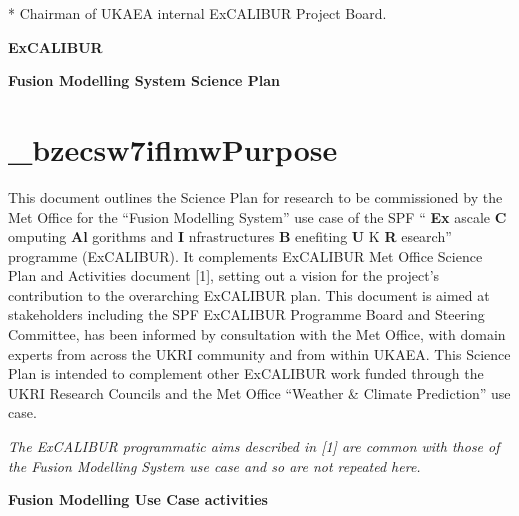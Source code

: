 \documentclass{article}
\begin{document}
\vspace{75pt}
\baselineskip=12pt
\leftskip=0pt
* Chairman of UKAEA internal ExCALIBUR Project Board.

\vspace{147pt}
\baselineskip=13pt
\parindent=-14pt
{\Huge{}{\color{color25} \textbf{ExCALIBUR}}}

\vspace{3pt}
\leftskip=-14pt
\parindent=0pt
{\Huge{}{\color{color25} \textbf{Fusion Modelling System Science Plan \label{}}}}

\vspace{12pt}
\section*{{\huge{}{\color{color25} \textbf{\_bzecsw7iflmwPurpose}}}}

\vspace{24pt}
{\color{color01} This document outlines the Science Plan for research to be commissioned 
by the Met Office for the ``Fusion Modelling System'' use case of the SPF ``}{\color{color25} \textbf{Ex}}{\color{color01} ascale 
}{\color{color25} \textbf{C}}{\color{color01} omputing }{\color{color25} \textbf{Al}}{\color{color01} gorithms 
and }{\color{color25} \textbf{I}}{\color{color01} nfrastructures }{\color{color25} \textbf{B}}{\color{color01} enefiting 
}{\color{color25} \textbf{U}}{\color{color01} K }{\color{color25} \textbf{R}}{\color{color01} esearch'' 
programme (ExCALIBUR). It complements ExCALIBUR Met Office Science Plan and Activities 
document [1], setting out a vision for the project's contribution to the overarching 
ExCALIBUR plan. This document is aimed at stakeholders including the SPF ExCALIBUR 
Programme Board and Steering Committee, has been informed by consultation with 
the Met Office, with domain experts from across the UKRI community and from within 
UKAEA. This Science Plan is intended to complement other ExCALIBUR work funded 
through the UKRI Research Councils and the Met Office ``Weather \& Climate Prediction'' 
use case.}

\vspace{25pt}
{\color{color01} \textit{The ExCALIBUR programmatic aims described in [1] are common 
with those of the Fusion Modelling System use case and so are not repeated here.}}

\vspace{39pt}
{\huge{}{\color{color25} \textbf{Fusion Modelling Use Case activities}}}

\vspace{12pt}
\end{document}
